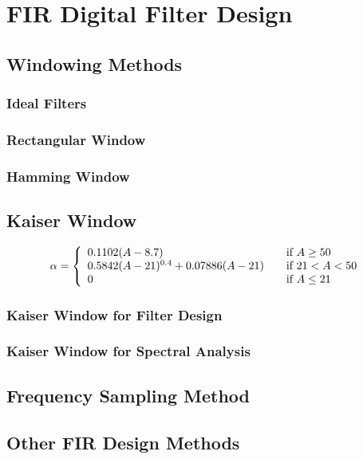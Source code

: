 \section{FIR Digital Filter Design}

\subsection{Windowing Methods}
\subsubsection{Ideal Filters}
\subsubsection{Rectangular Window}
\subsubsection{Hamming Window}

\subsection{Kaiser Window}
\begin{align}
	\alpha = \left\{
		\begin{array}{l l}
			0.1102(A-8.7)& \quad \text{if } A \geq 50\\
			0.5842(A-21)^{0.4}+0.07886(A-21) & \quad \text{if }21 < A < 50\\
			0 & \quad \text{if } A \leq 21
		\end{array} \right.
\end{align}
\subsubsection{Kaiser Window for Filter Design}
\subsubsection{Kaiser Window for Spectral Analysis}

\subsection{Frequency Sampling Method}

\subsection{Other FIR Design Methods}

